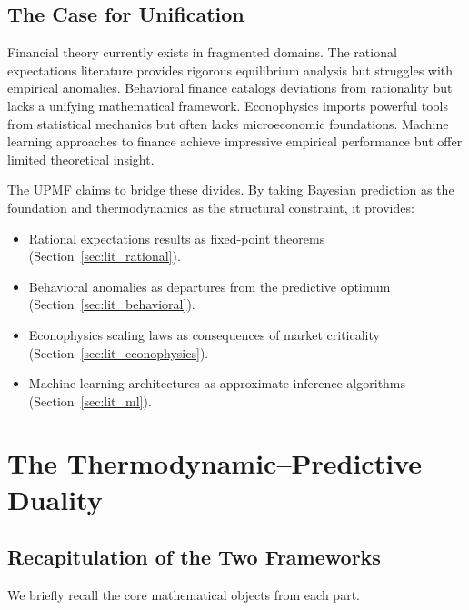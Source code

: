 \documentclass[12pt,a4paper]{article}
\theoremstyle{definition}
\begin{document}
\subsection{The Case for Unification}

Financial theory currently exists in fragmented domains. The rational expectations literature \citep{muth1961,lucas1972,grossman1980} provides rigorous equilibrium analysis but struggles with empirical anomalies. Behavioral finance \citep{kahneman1979,shiller2000,thaler2015} catalogs deviations from rationality but lacks a unifying mathematical framework. Econophysics \citep{mantegna2000,bouchaud2003,sornette2003} imports powerful tools from statistical mechanics but often lacks microeconomic foundations. Machine learning approaches to finance \citep{gu2020,dixon2020} achieve impressive empirical performance but offer limited theoretical insight.

The UPMF claims to bridge these divides. By taking Bayesian prediction as the foundation and thermodynamics as the structural constraint, it provides:
\begin{itemize}
    \item Rational expectations results as fixed-point theorems (Section~\ref{sec:lit_rational}).
    \item Behavioral anomalies as departures from the predictive optimum (Section~\ref{sec:lit_behavioral}).
    \item Econophysics scaling laws as consequences of market criticality (Section~\ref{sec:lit_econophysics}).
    \item Machine learning architectures as approximate inference algorithms (Section~\ref{sec:lit_ml}).
\end{itemize}



\section{The Thermodynamic--Predictive Duality}\label{sec:duality}

\subsection{Recapitulation of the Two Frameworks}

We briefly recall the core mathematical objects from each part.
\end{document}
